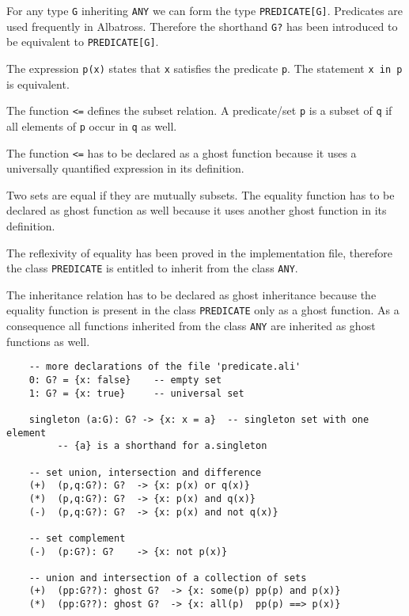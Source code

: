 For any type \lstinline!G! inheriting \lstinline!ANY! we can form the type
\lstinline!PREDICATE[G]!. Predicates are used frequently in
Albatross. Therefore the shorthand \lstinline!G?! has been introduced to be
equivalent to \lstinline!PREDICATE[G]!.

The expression \lstinline!p(x)! states that \lstinline!x! satisfies the
predicate \lstinline!p!. The statement \lstinline!x in p! is equivalent.

The function \lstinline!<=! defines the subset relation. A predicate/set
\lstinline!p! is a subset of \lstinline!q! if all elements of \lstinline!p!
occur in \lstinline!q! as well.

The function \lstinline!<=! has to be declared as a ghost function because it
uses a universally quantified expression in its definition.

Two sets are equal if they are mutually subsets. The equality function has to
be declared as ghost function as well because it uses another ghost function
in its definition.

The reflexivity of equality has been proved in the implementation file,
therefore the class \lstinline!PREDICATE! is entitled to inherit from the
class \lstinline!ANY!.

The inheritance relation has to be declared as ghost inheritance because the
equality function is present in the class \lstinline!PREDICATE! only as a
ghost function. As a consequence all functions inherited from the class
\lstinline!ANY! are inherited as ghost functions as well.

\begin{lstlisting}
    -- more declarations of the file 'predicate.ali'
    0: G? = {x: false}    -- empty set
    1: G? = {x: true}     -- universal set

    singleton (a:G): G? -> {x: x = a}  -- singleton set with one element
         -- {a} is a shorthand for a.singleton

    -- set union, intersection and difference
    (+)  (p,q:G?): G?  -> {x: p(x) or q(x)}
    (*)  (p,q:G?): G?  -> {x: p(x) and q(x)}
    (-)  (p,q:G?): G?  -> {x: p(x) and not q(x)}

    -- set complement
    (-)  (p:G?): G?    -> {x: not p(x)}

    -- union and intersection of a collection of sets
    (+)  (pp:G??): ghost G?  -> {x: some(p) pp(p) and p(x)}
    (*)  (pp:G??): ghost G?  -> {x: all(p)  pp(p) ==> p(x)}
\end{lstlisting}

